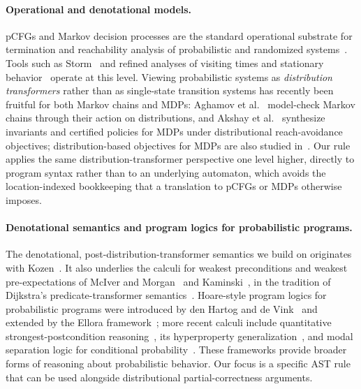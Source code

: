 \paragraph{Operational and denotational models.}
pCFGs and Markov decision processes are the standard operational substrate for termination and reachability analysis of probabilistic and randomized systems~\cite{DBLP:books/wi/Puterman94,DBLP:books/sp/BaierK08}. Tools such as Storm~\cite{DBLP:journals/sttt/HenselJKQV22} and refined analyses of visiting times and stationary behavior~\cite{DBLP:conf/tacas/MertensKQW24,DBLP:journals/jcss/JungesK0W21} operate at this level. Viewing probabilistic systems as \emph{distribution transformers} rather than as single-state transition systems has recently been fruitful for both Markov chains and MDPs: Aghamov et al.~\cite{DBLP:journals/corr/abs-2406-15087,DBLP:conf/birthday/AghamovBKNOPV25} model-check Markov chains through their action on distributions, and Akshay et al.~\cite{DBLP:conf/cav/AkshayCMZ23,DBLP:conf/ijcai/0001CMZ24} synthesize invariants and certified policies for MDPs under distributional reach-avoidance objectives; distribution-based objectives for MDPs are also studied in~\cite{DBLP:conf/lics/AkshayGV18}. Our rule applies the same distribution-transformer perspective one level higher, directly to program syntax rather than to an underlying automaton, which avoids the location-indexed bookkeeping that a translation to pCFGs or MDPs otherwise imposes.

\paragraph{Denotational semantics and program logics for probabilistic programs.}
The denotational, post-distribution-transformer semantics we build on originates with Kozen~\cite{DBLP:conf/focs/Kozen79,DBLP:conf/stoc/Kozen83}. It also underlies the calculi for weakest preconditions and weakest pre-expectations of McIver and Morgan~\cite{DBLP:series/mcs/McIverM05} and Kaminski~\cite{DBLP:phd/dnb/Kaminski19}, in the tradition of Dijkstra's predicate-transformer semantics~\cite{DBLP:journals/cacm/Dijkstra75,DBLP:books/daglib/0067387}. Hoare-style program logics for probabilistic programs were introduced by den Hartog and de Vink~\cite{DBLP:journals/ijfcs/HartogV02} and extended by the Ellora framework~\cite{DBLP:conf/esop/BartheEGGHS18}; more recent calculi include quantitative strongest-postcondition reasoning~\cite{DBLP:journals/pacmpl/ZhangK22}, its hyperproperty generalization~\cite{DBLP:journals/corr/abs-2404-05097}, and modal separation logic for conditional probability~\cite{DBLP:journals/pacmpl/Li0H23}. These frameworks provide broader forms of reasoning about probabilistic behavior. Our focus is a specific AST rule that can be used alongside distributional partial-correctness arguments.

